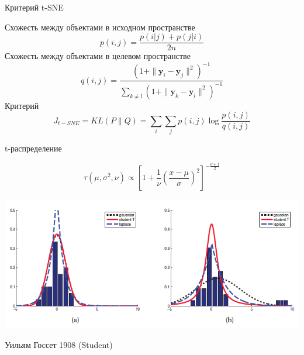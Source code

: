 \documentclass[10pt]{beamer}
\begin{document}
\begin{frame}{Критерий t-SNE}

Схожесть между объектами в исходном пространстве
\[
p(i, j) = \frac{p(i | j) + p(j | i)}{2n}
\]
Схожесть между объектами в целевом пространстве
\[
q(i, j) = \frac{(1 + \| \mathbf{y}_i - \mathbf{y}_j \|^2)^{-1}}{\sum_{k \neq l}(1 + \| \mathbf{y}_k - \mathbf{y}_l \|^2)^{-1}}
\]
Критерий
\[
J_{t-SNE} = KL(P \| Q) = \sum_i \sum_j p(i, j) \log \frac{p(i, j)}{q(i, j)}
\]

\end{frame}

\begin{frame}{t-распределение}

\[
\tau(\mu, \sigma^2, \nu) \propto \left[1 + \frac{1}{\nu}\left(\frac{x-\mu}{\sigma}\right)^2\right]^{-\frac{\nu+1}{2}}
\]

\begin{center}
\includegraphics[scale=0.4]{images/t-distr.png}
\end{center}

Уильям Госсет 1908 (Student)

\end{frame}
\end{document}
